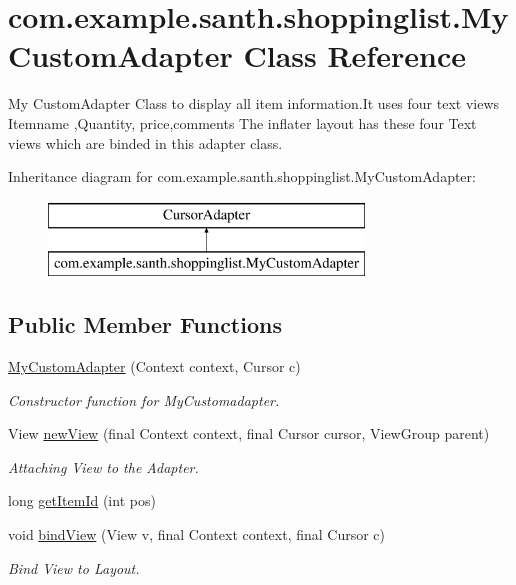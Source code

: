 \hypertarget{classcom_1_1example_1_1santh_1_1shoppinglist_1_1_my_custom_adapter}{}\section{com.\+example.\+santh.\+shoppinglist.\+My\+Custom\+Adapter Class Reference}
\label{classcom_1_1example_1_1santh_1_1shoppinglist_1_1_my_custom_adapter}


My Custom\+Adapter Class to display all item information.\+It uses four text views Itemname ,Quantity, price,comments The inflater layout has these four Text views which are binded in this adapter class.  


Inheritance diagram for com.\+example.\+santh.\+shoppinglist.\+My\+Custom\+Adapter\+:\begin{figure}[H]
\begin{center}
\leavevmode
\includegraphics[height=2.000000cm]{classcom_1_1example_1_1santh_1_1shoppinglist_1_1_my_custom_adapter}
\end{center}
\end{figure}
\subsection*{Public Member Functions}
\begin{DoxyCompactItemize}
\item 
\hyperlink{classcom_1_1example_1_1santh_1_1shoppinglist_1_1_my_custom_adapter_a5f294d42d4509ab9b456a4a756a01390}{My\+Custom\+Adapter} (Context context, Cursor c)
\begin{DoxyCompactList}\small\item\em Constructor function for My\+Customadapter. \end{DoxyCompactList}\item 
View \hyperlink{classcom_1_1example_1_1santh_1_1shoppinglist_1_1_my_custom_adapter_ab62e3e7040d84494b8e1c90812aad581}{new\+View} (final Context context, final Cursor cursor, View\+Group parent)
\begin{DoxyCompactList}\small\item\em Attaching View to the Adapter. \end{DoxyCompactList}\item 
long \hyperlink{classcom_1_1example_1_1santh_1_1shoppinglist_1_1_my_custom_adapter_ab8529e9563ccab567daf7a7467a95eb1}{get\+Item\+Id} (int pos)
\item 
void \hyperlink{classcom_1_1example_1_1santh_1_1shoppinglist_1_1_my_custom_adapter_a7f9fb1e4d114f98be51aa8b76899d740}{bind\+View} (View v, final Context context, final Cursor c)
\begin{DoxyCompactList}\small\item\em Bind View to Layout. \end{DoxyCompactList}\end{DoxyCompactItemize}


